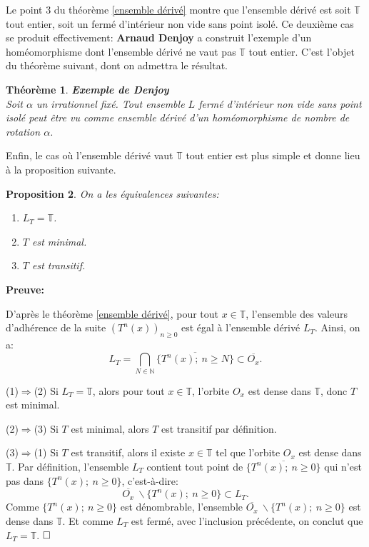 \documentclass[11pt,a4 paper]{article}
\newtheorem{theoreme}{Théorème}[section]
\newtheorem{propriete}[theoreme]{Proposition}
\newcommand{\Tbb}{\mathbb{T}}
\newenvironment{thm}{\begin{box_thm}\begin{theoreme}}{\end{theoreme}\end{box_thm}}
\newenvironment{ppt}{\begin{box_ppt}\begin{propriete}}{\end{propriete}\end{box_ppt}}
\begin{document}
	Le point 3 du théorème \ref{ensemble dérivé} montre que l'ensemble dérivé est soit $\Tbb$ tout entier, soit un fermé d'intérieur non vide sans point isolé. Ce deuxième cas se produit effectivement: \textbf{Arnaud Denjoy} a construit l'exemple d'un homéomorphisme dont l'ensemble dérivé ne vaut pas $\Tbb$ tout entier. C'est l'objet du théorème suivant, dont on admettra le résultat.
	
\begin{thm}\label{Denjoy}
	\textbf{Exemple de Denjoy}\\
	Soit $\alpha$ un irrationnel fixé. Tout ensemble $L$ fermé d'intérieur non vide sans point isolé peut être vu comme ensemble dérivé d'un homéomorphisme de nombre de rotation $\alpha$.
\end{thm}



Enfin, le cas où l'ensemble dérivé vaut $\Tbb$ tout entier est plus simple et donne lieu à la proposition suivante.

\begin{ppt}
 	On a les équivalences suivantes:
 	\begin{enumerate}
		\item $L_T= \Tbb$.
		\item $T$ est minimal.
		\item $T$ est transitif.
 	\end{enumerate}
\end{ppt}

	\textbf{Preuve:}
	\par D'après le théorème \ref{ensemble dérivé}, pour tout $x \in \Tbb$, l'ensemble des valeurs d'adhérence de la suite $(T^n(x))_{n\geq 0}$ est égal à l'ensemble dérivé $L_T$.
	 Ainsi, on a:
	$$L_T= \underset{N \in \mathbb{N}}{\bigcap}\overline{\lbrace T^n(x); \ n\geq N\rbrace}\subset \overline{O_x} .$$
	
	\par(1)$\Rightarrow$(2) Si $L_T = \Tbb$, alors pour tout $x \in \Tbb$, l'orbite $O_x$ est dense dans $\Tbb$, donc $T$ est minimal.\\
	
	\par(2)$\Rightarrow$(3) Si $T$ est minimal, alors $T$ est transitif par définition.\\
	
	\par(3)$\Rightarrow$(1) Si $T$ est transitif, alors il existe $x \in \Tbb$ tel que l'orbite $O_x$ est dense dans $\Tbb$. Par définition, l'ensemble $L_T$ contient tout point de $\overline{\lbrace T^n(x);\ n \geq 0\rbrace}$ qui n'est pas dans $\lbrace T^n(x);\ n \geq 0\rbrace$, c'est-à-dire:
		$$\overline{O_x}\ \backslash \lbrace T^n(x);\ n \geq 0\rbrace \subset L_T.$$
	Comme $\lbrace T^n(x);\ n \geq 0\rbrace$ est dénombrable, l'ensemble $\overline{O_x}\ \backslash \lbrace T^n(x);\ n \geq 0\rbrace$ est dense dans $\Tbb$. Et comme $L_T$ est fermé, avec l'inclusion précédente, on conclut que $L_T= \Tbb$. $\hfill \square$\\
\end{document}
